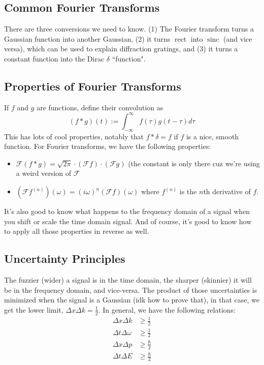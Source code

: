 \documentclass[12pt]{article}
\begin{document}
\subsection{Common Fourier Transforms}
There are three conversions we need to know. (1) The Fourier transform turns a Gaussian function into another Gaussian, (2) it turns $\operatorname{rect}$ into $\operatorname{sinc}$ (and vice versa), which can be used to explain diffraction gratings, and (3) it turns a constant function into the Dirac $\delta$ ``function".

\subsection{Properties of Fourier Transforms}
If $f$ and $g$ are functions, define their convolution as
\[ (f * g)(t) := \int_{-\infty}^\infty f(\tau)g(t-\tau)d\tau \]
This has lots of cool properties, notably that $f * \delta = f$ if $f$ is a nice, smooth function. For Fourier transforms, we have the following properties:
\begin{itemize}
    \item $\mathcal{F}(f * g) = \sqrt{2 \pi} \cdot (\mathcal{F} f) \cdot (\mathcal{F} g)$ (the constant is only there cuz we're using a weird version of $\mathcal{F}$
    \item $(\mathcal{F} f^{(n)}) (\omega) = (i \omega)^n (\mathcal{F} f)(\omega)$ where $f^{(n)}$ is the $n$th derivative of $f$.
\end{itemize}
It's also good to know what happens to the frequency domain of a signal when you shift or scale the time domain signal. And of course, it's good to know how to apply all those properties in reverse as well.

\subsection{Uncertainty Principles}
The fuzzier (wider) a signal is in the time domain, the sharper (skinnier) it will be in the frequency domain, and vice-versa. The product of those uncertainties is minimized when the signal is a Gaussian (idk how to prove that), in that case, we get the lower limit, $\Delta x \Delta k = \frac{1}{2}$. In general, we have the following relations:
\begin{align*}
    \Delta x \Delta k &\geq \frac{1}{2} \\
    \Delta t \Delta \omega &\geq \frac{1}{2} \\
    \Delta x \Delta p &\geq \frac{\hbar}{2} \\
    \Delta t \Delta E &\geq \frac{\hbar}{2}
\end{align*}
\end{document}

